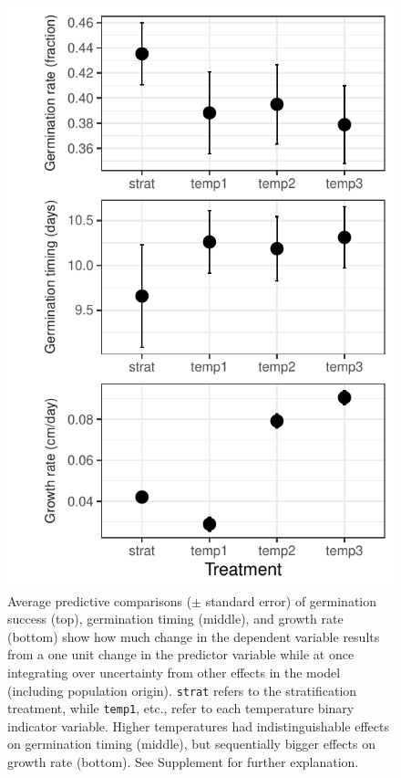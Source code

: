 \documentclass[11pt]{article}\usepackage[]{graphicx}\usepackage[]{color}
\begin{document}
\begin{figure}
	\begin{center}
	\includegraphics[width=.8\textwidth]{apc_fig.pdf}
	\caption{Average predictive comparisons ($\pm$ standard error) of germination success (top), germination timing (middle), and growth rate (bottom) show how much change in the dependent variable results from a one unit change in the predictor variable while at once integrating over uncertainty from other effects in the model (including population origin). \texttt{strat} refers to the stratification treatment, while \texttt{temp1}, etc., refer to each temperature binary indicator variable. Higher temperatures had indistinguishable effects on germination timing (middle), but sequentially bigger effects on growth rate (bottom). See Supplement for further explanation.}
\label{fig:apc}
\end{center}
\end{figure}
\end{document}

